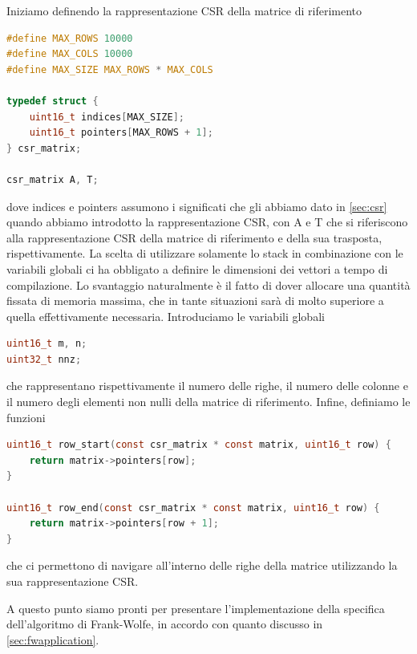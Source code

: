 Iniziamo definendo la rappresentazione CSR della matrice di riferimento
\begin{inline}
\begin{lstlisting}[style = style2, language=c]
#define MAX_ROWS 10000
#define MAX_COLS 10000
#define MAX_SIZE MAX_ROWS * MAX_COLS

typedef struct {
    uint16_t indices[MAX_SIZE];
    uint16_t pointers[MAX_ROWS + 1];
} csr_matrix;

csr_matrix A, T;
\end{lstlisting}
\end{inline}
\noindent
dove {\jbm indices} e {\jbm pointers} assumono i significati che gli abbiamo dato in \ref{sec:csr} quando abbiamo
introdotto la rappresentazione CSR, con {\jbm A} e {\jbm T} che si riferiscono alla rappresentazione CSR della matrice
di riferimento e della sua trasposta, rispettivamente. La scelta di utilizzare solamente lo stack in combinazione con le
variabili globali ci ha obbligato a definire le dimensioni dei vettori a tempo di compilazione. Lo svantaggio naturalmente è
il fatto di dover allocare una quantità fissata di memoria massima, che in tante situazioni sarà di molto superiore a
quella effettivamente necessaria.
Introduciamo le variabili globali
\begin{inline}
\begin{lstlisting}[style = style2, language=c]
uint16_t m, n;
uint32_t nnz;
\end{lstlisting}
\end{inline}
\noindent
che rappresentano rispettivamente il numero delle righe, il numero delle colonne e il numero degli elementi non nulli
della matrice di riferimento.
Infine, definiamo le funzioni
\begin{inline}
\begin{lstlisting}[style = style2, language=c]
uint16_t row_start(const csr_matrix * const matrix, uint16_t row) {
    return matrix->pointers[row];
}

uint16_t row_end(const csr_matrix * const matrix, uint16_t row) {
    return matrix->pointers[row + 1];
}
\end{lstlisting}
\end{inline}
\noindent
che ci permettono di navigare all'interno delle righe della matrice utilizzando la sua rappresentazione CSR.

A questo punto siamo pronti per presentare l'implementazione della specifica dell'algoritmo di Frank-Wolfe, in accordo
con quanto discusso in \ref{sec:fwapplication}.

